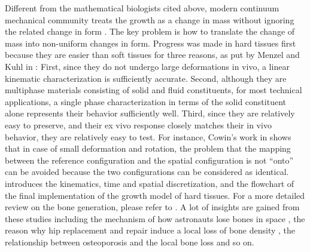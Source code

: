 Different from the mathematical biologists cited above, modern continuum mechanical community treats the growth as a change in mass without ignoring the related change in form \cite{Ambrosi}. The key problem is how to translate the change of mass into non-uniform changes in form. Progress was made in hard tissues first because they are easier than soft tissues for three reasons, as put by Menzel and Kuhl in \cite{Menzel}: First, since they do not undergo large deformations in vivo, a linear kinematic characterization is sufficiently accurate.  Second, although they are multiphase materials consisting of solid and fluid constituents, for most technical applications, a single phase characterization in terms of the solid constituent alone represents their behavior sufficiently well. Third, since they are relatively easy to preserve, and their ex vivo response closely matches their in vivo behavior, they are relatively easy to test. For instance, Cowin's work in \cite{Cowin} shows that in case of small deformation and rotation, the problem that the mapping between the reference configuration and the spatial configuration is not ``onto'' can be avoided because the two configurations can be considered as identical. \cite{Kuhl} introduces the kinematics, time and spatial discretization, and the flowchart of the final implementation of the growth model of hard tissues. For a more detailed review on the bone generation, please refer to \cite{Isaksson}. A lot of insights are gained from these studies including the mechanism of how astronauts lose bones in space \cite{Kuhl2}, the reason why hip replacement and repair induce a local loss of bone density \cite{Ambrosi}, the relationship between osteoporosis and the local bone loss \cite{Pang} and so on.


